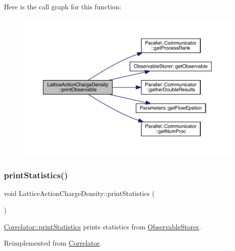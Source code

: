 Here is the call graph for this function\+:\nopagebreak
\begin{figure}[H]
\begin{center}
\leavevmode
\includegraphics[width=350pt]{class_lattice_action_charge_density_abb7db718d4069faab0ed19f31aa85ad4_cgraph}
\end{center}
\end{figure}
\mbox{\label{class_lattice_action_charge_density_abdaa497dd70dee58b810de7315241a56}} 
\subsubsection{\texorpdfstring{printStatistics()}{printStatistics()}}
{\footnotesize\ttfamily void Lattice\+Action\+Charge\+Density\+::print\+Statistics (\begin{DoxyParamCaption}{ }\end{DoxyParamCaption})\hspace{0.3cm}{\ttfamily [virtual]}}



\mbox{\hyperlink{class_correlator_a2168d677f547769784781d2e2aaa53cf}{Correlator\+::print\+Statistics}} prints statistics from \mbox{\hyperlink{class_observable_storer}{Observable\+Storer}}. 



Reimplemented from \mbox{\hyperlink{class_correlator_a2168d677f547769784781d2e2aaa53cf}{Correlator}}.

